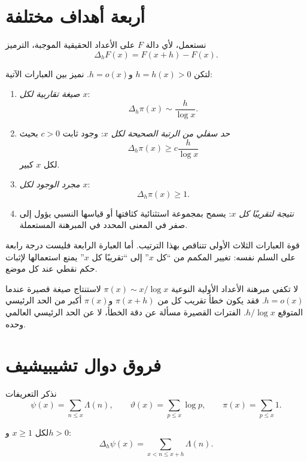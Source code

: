 \section{أربعة أهداف مختلفة}

نستعمل، لأي دالة \(F\) على الأعداد الحقيقية الموجبة، الترميز
\[
\Delta_hF(x)=F(x+h)-F(x).
\]

\begin{definition}
\label{def:short-interval-regimes}
\provedhere
لتكن \(h=h(x)>0\) و\(h=o(x)\). نميز بين العبارات الآتية:
\begin{enumerate}
  \item \emph{صيغة تقاربية لكل \(x\)}:
  \[
  \Delta_h\pi(x)\sim\frac{h}{\log x}.
  \]
  \item \emph{حد سفلي من الرتبة الصحيحة لكل \(x\)}: وجود ثابت \(c>0\) بحيث
  \[
  \Delta_h\pi(x)\ge c\frac{h}{\log x}
  \]
  لكل \(x\) كبير.
  \item \emph{مجرد الوجود لكل \(x\)}:
  \[
  \Delta_h\pi(x)\ge1.
  \]
  \item \emph{نتيجة لتقريبًا كل \(x\)}: يسمح بمجموعة استثنائية كثافتها أو قياسها النسبي يؤول إلى صفر في المعنى المحدد في المبرهنة المستعملة.
\end{enumerate}
\end{definition}

قوة العبارات الثلاث الأولى تتناقص بهذا الترتيب. أما العبارة الرابعة فليست درجة رابعة على السلم نفسه: تغيير المكمم من ``كل \(x\)'' إلى ``تقريبًا كل \(x\)'' يمنع استعمالها لإثبات حكم نقطي عند كل موضع.

\begin{remark}
لا تكفي مبرهنة الأعداد الأولية النوعية
\(
\pi(x)\sim x/\log x
\)
لاستنتاج صيغة قصيرة عندما \(h=o(x)\). فقد يكون خطأ تقريب كل من \(\pi(x+h)\) و\(\pi(x)\) أكبر من الحد الرئيسي المتوقع \(h/\log x\). الفترات القصيرة مسألة عن دقة الخطأ، لا عن الحد الرئيسي العالمي وحده.
\end{remark}

\section{فروق دوال تشيبيشيف}

نذكر التعريفات
\[
\psi(x)=\sum_{n\le x}\Lambda(n),
\qquad
\vartheta(x)=\sum_{p\le x}\log p,
\qquad
\pi(x)=\sum_{p\le x}1.
\]

\begin{proposition}
\label{prop:short-interval-psi-identity}
\provedhere
لكل \(x\ge1\) و\(h>0\):
\[
\Delta_h\psi(x)
=
\sum_{x<n\le x+h}\Lambda(n).
\]
\end{proposition}

